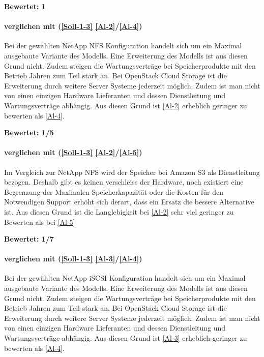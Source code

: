 \textbf{Bewertet: 1}

\paragraph*{  verglichen mit  (\ref{Soll-1-3} \ref{Al-2}/\ref{Al-4})}
Bei der gewählten NetApp NFS Konfiguration handelt sich um ein Maximal ausgebaute Variante des Modells. Eine Erweiterung des Modells ist aus diesen Grund nicht. Zudem steigen die Wartungsverträge bei Speicherprodukte mit den Betrieb Jahren zum Teil stark an. Bei OpenStack Cloud Storage ist die Erweiterung durch weitere Server Systeme jederzeit möglich. Zudem ist man nicht von einen einzigen Hardware Lieferanten und dessen Dienstleitung und Wartungsverträge abhängig. Aus diesen Grund ist  \ref{Al-2} erheblich geringer zu bewerten als  \ref{Al-4}.

\textbf{Bewertet: 1/5}

\paragraph*{  verglichen mit  (\ref{Soll-1-3} \ref{Al-2}/\ref{Al-5})}
Im Vergleich zur NetApp NFS wird der Speicher bei Amazon S3 als Dienstleitung bezogen. Deshalb gibt es keinen verschleiss der Hardware, noch existiert eine Begrenzung der Maximalen Speicherkapazität oder die Kosten für den Notwendigen Support erhöht sich derart, dass ein Ersatz die bessere Alternative ist.
Aus diesen Grund ist die Langlebigkeit bei  \ref{Al-2} sehr viel geringer zu Bewerten als bei  \ref{Al-5}

\textbf{Bewertet: 1/7}

\paragraph*{  verglichen mit  (\ref{Soll-1-3} \ref{Al-3}/\ref{Al-4})}
Bei der gewählten NetApp iSCSI Konfiguration handelt sich um ein Maximal ausgebaute Variante des Modells. Eine Erweiterung des Modells ist aus diesen Grund nicht. Zudem steigen die Wartungsverträge bei Speicherprodukte mit den Betrieb Jahren zum Teil stark an. Bei OpenStack Cloud Storage ist die Erweiterung durch weitere Server Systeme jederzeit möglich. Zudem ist man nicht von einen einzigen Hardware Lieferanten und dessen Dienstleitung und Wartungsverträge abhängig. Aus diesen Grund ist  \ref{Al-3} erheblich geringer zu bewerten als  \ref{Al-4}.

